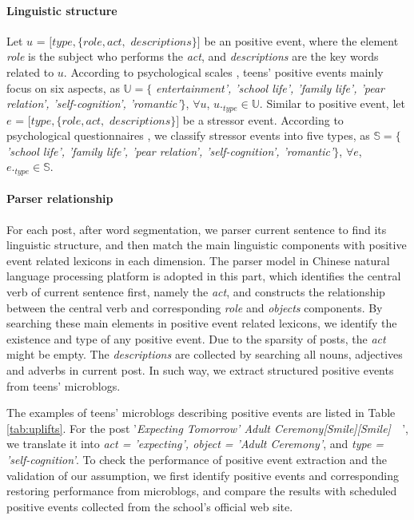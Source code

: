 \paragraph{Linguistic structure}
Let $u$ = $[type,\{role, act,$ $descriptions\}]$ be an positive event,
where the element \emph{role} is the subject who performs the \emph{act},
and \emph{descriptions} are the key words related to $u$.
According to psychological scales \cite{hassles,Jun2008Influence},
teens' positive events mainly focus on six aspects,
as $\mathbb{U} =\{$ \emph{entertainment', 'school life', 'family life',
'pear relation', 'self-cognition', 'romantic'}$\}$, $\forall u$, $u._{type} \in \mathbb{U}$.
Similar to positive event,
let $e$ = $[type,\{role, act,$ $descriptions\}]$ be a stressor event.
According to psychological questionnaires \cite{scale2, scale3, Kanner1981Comparison, scale1},
we classify stressor events into five types, as $\mathbb{S}=\{$ \emph{'school life', 'family life',
'pear relation', 'self-cognition', 'romantic'}$\}$, $\forall e$, $e._{type} \in \mathbb{S}$.


\paragraph{Parser relationship}
For each post, after word segmentation, we parser current sentence to find its linguistic structure,
and then match the main linguistic components with positive event related lexicons in each dimension.
The parser model in Chinese natural language processing platform \cite{Che2010, che2008} is adopted in this part,
which identifies the central verb of current sentence first, namely the \emph{act},
and constructs the relationship between the central verb and corresponding \emph{role} and \emph{objects} components.
By searching these main elements in positive event related lexicons,
we identify the existence and type of any positive event.
Due to the sparsity of posts, the \emph{act} might be empty.
The \emph{descriptions} are collected by searching all nouns, adjectives and adverbs in current post.
In such way, we extract structured positive events from teens' microblogs.

The examples of teens' microblogs describing positive events are listed in Table \ref{tab:uplifts}.
For the post '\emph{Expecting Tomorrow' Adult Ceremony[Smile][Smile]~~}',
we translate it into \emph{act = 'expecting', object = 'Adult Ceremony'},
and \emph{type = 'self-cognition'}.
To check the performance of positive event extraction and the validation of our assumption,
we first identify positive events and corresponding restoring performance from microblogs,
and compare the results with scheduled positive events collected from the school's official web site.

